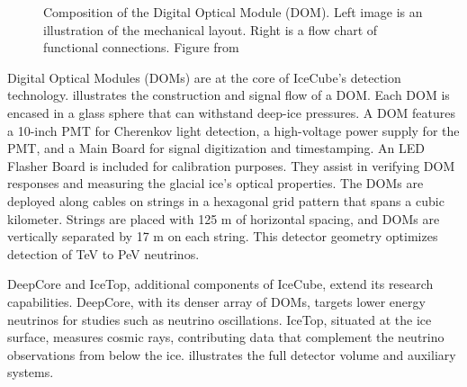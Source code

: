 \begin{figure}
    \caption{Composition of the Digital Optical Module (DOM). Left image is an illustration of the mechanical layout. Right is a flow chart of functional connections. Figure from \cite{IC3_thedetector}}
    \label{fig:DOM}
\end{figure}

Digital Optical Modules (DOMs) are at the core of IceCube’s detection technology.
 illustrates the construction and signal flow of a DOM.
Each DOM is encased in a glass sphere that can withstand deep-ice pressures.
A DOM features a 10-inch PMT for Cherenkov light detection, a high-voltage power supply for the PMT, and a Main Board for signal digitization and timestamping.
An LED Flasher Board is included for calibration purposes.
They assist in verifying DOM responses and measuring the glacial ice's optical properties.
The DOMs are deployed along cables on strings in a hexagonal grid pattern that spans a cubic kilometer.
Strings are placed with 125 m of horizontal spacing, and DOMs are vertically separated by 17 m on each string.
This detector geometry optimizes detection of TeV to PeV neutrinos.

DeepCore and IceTop, additional components of IceCube, extend its research capabilities.
DeepCore, with its denser array of DOMs, targets lower energy neutrinos for studies such as neutrino oscillations.
IceTop, situated at the ice surface, measures cosmic rays, contributing data that complement the neutrino observations from below the ice.
 illustrates the full detector volume and auxiliary systems.

